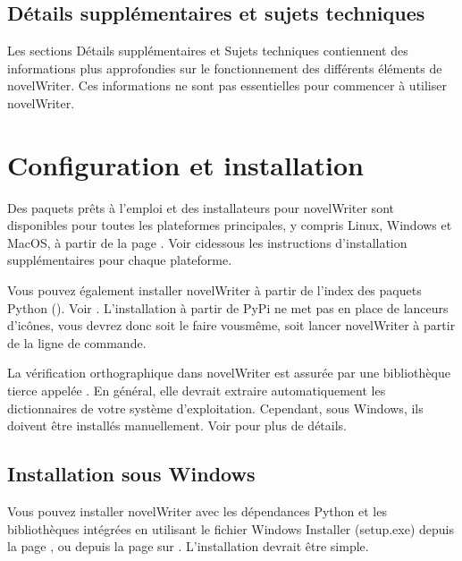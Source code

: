 \documentclass[a4paper,11pt,french]{sphinxmanual}
\begin{document}
\section{Détails supplémentaires et sujets techniques}
\label{\detokenize{int_overview:additional-details-technical-topics}}
\sphinxAtStartPar
Les sections Détails supplémentaires et Sujets techniques contiennent des informations plus approfondies sur le fonctionnement des différents éléments de novelWriter. Ces informations ne sont pas essentielles pour commencer à utiliser novelWriter.

\sphinxstepscope


\chapter{Configuration et installation}
\label{\detokenize{int_started:setup-and-installation}}\label{\detokenize{int_started:a-started}}\label{\detokenize{int_started::doc}}
\sphinxAtStartPar
Des paquets prêts à l’emploi et des installateurs pour novelWriter sont disponibles pour toutes les plateformes principales, y compris Linux, Windows et MacOS, à partir de la page . Voir ci\sphinxhyphen{}dessous les instructions d’installation supplémentaires pour chaque plateforme.

\sphinxAtStartPar
Vous pouvez également installer novelWriter à partir de l’index des paquets Python (). Voir {\hyperref[\detokenize{int_started:a-started-pip}]{}}. L’installation à partir de PyPi ne met pas en place de lanceurs d’icônes, vous devrez donc soit le faire vous\sphinxhyphen{}même, soit lancer novelWriter à partir de la ligne de commande.

\sphinxAtStartPar
La vérification orthographique dans novelWriter est assurée par une bibliothèque tierce appelée . En général, elle devrait extraire automatiquement les dictionnaires de votre système d’exploitation. Cependant, sous Windows, ils doivent être installés manuellement. Voir {\hyperref[\detokenize{more_customise:a-custom-dict}]{}} pour plus de détails.


\section{Installation sous Windows}
\label{\detokenize{int_started:installing-on-windows}}\label{\detokenize{int_started:a-started-windows}}
\sphinxAtStartPar
Vous pouvez installer novelWriter avec les dépendances Python et les bibliothèques intégrées en utilisant le fichier Windows Installer (setup.exe) depuis la page , ou depuis la page  sur . L’installation devrait être simple.
\end{document}
